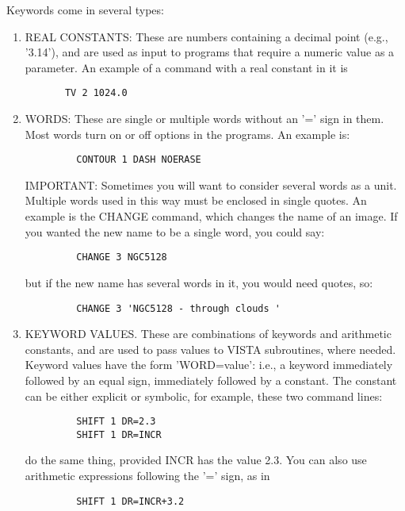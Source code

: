 Keywords come in several types:
\begin{enumerate}
   \item REAL CONSTANTS: These are numbers containing a decimal point
         (e.g., '3.14'), and are used as input to programs that require a
         numeric value as a parameter.  An example of a command with a real
         constant in it is
	 \begin{verbatim}
	   TV 2 1024.0
	 \end{verbatim}

\item WORDS: These are single or multiple words without an
      '=' sign in them.  Most words turn on or off options in the programs.
      An example is:
      \begin{verbatim}
         CONTOUR 1 DASH NOERASE
      \end{verbatim}
      IMPORTANT: Sometimes you will want to consider several words as a
      unit.  Multiple words used in this way must be enclosed in single
      quotes.  An example is the CHANGE command, which changes the name of
      an image.  If you wanted the new name to be a single word, you could
      say:
      \begin{verbatim}
         CHANGE 3 NGC5128
      \end{verbatim}
      but if the new name has several words in it, you would need quotes,
      so:
      \begin{verbatim}
         CHANGE 3 'NGC5128 - through clouds '
      \end{verbatim}

\item KEYWORD VALUES.  These are combinations of keywords and
      arithmetic constants, and are used to pass values to VISTA
      subroutines, where needed.  Keyword values have the form
      'WORD=value': i.e., a keyword immediately followed by an equal sign,
      immediately followed by a constant.  The constant can be either
      explicit or symbolic, for example, these two command lines:
      \begin{verbatim}
         SHIFT 1 DR=2.3
         SHIFT 1 DR=INCR
      \end{verbatim}
      do the same thing, provided INCR has the value 2.3.  You can also use
      arithmetic expressions following the '=' sign, as in 
      \begin{verbatim}
         SHIFT 1 DR=INCR+3.2
      \end{verbatim}

\end{enumerate}

